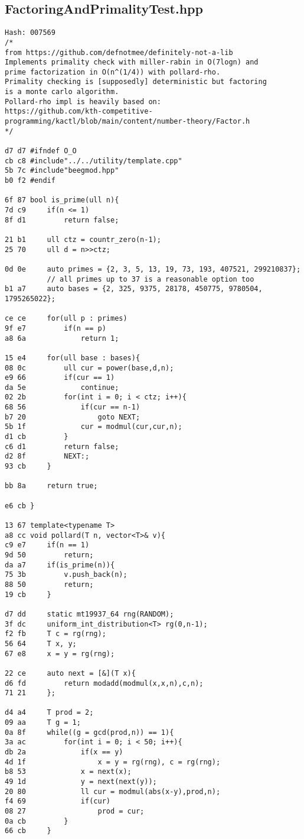 \documentclass[11pt, a4paper, twoside]{article}
\begin{document}
\subsection{FactoringAndPrimalityTest.hpp}
\begin{lstlisting}
Hash: 007569
/*
from https://github.com/defnotmee/definitely-not-a-lib
Implements primality check with miller-rabin in O(7logn) and
prime factorization in O(n^(1/4)) with pollard-rho.
Primality checking is [supposedly] deterministic but factoring
is a monte carlo algorithm.
Pollard-rho impl is heavily based on:
https://github.com/kth-competitive-programming/kactl/blob/main/content/number-theory/Factor.h
*/

d7 d7 #ifndef O_O
cb c8 #include"../../utility/template.cpp"
5b 7c #include"beegmod.hpp"
b0 f2 #endif

6f 87 bool is_prime(ull n){
7d c9     if(n <= 1)
8f d1         return false;
      
21 b1     ull ctz = countr_zero(n-1);
25 70     ull d = n>>ctz;
      
0d 0e     auto primes = {2, 3, 5, 13, 19, 73, 193, 407521, 299210837};
          // all primes up to 37 is a reasonable option too
b1 a7     auto bases = {2, 325, 9375, 28178, 450775, 9780504, 1795265022};
      
ce ce     for(ull p : primes)
9f e7         if(n == p)
a8 6a             return 1;
      
15 e4     for(ull base : bases){
08 0c         ull cur = power(base,d,n);
e9 66         if(cur == 1)
da 5e             continue;
02 2b         for(int i = 0; i < ctz; i++){
68 56             if(cur == n-1)
b7 20                 goto NEXT;
5b 1f             cur = modmul(cur,cur,n);
d1 cb         }
c6 d1         return false;
d2 8f         NEXT:;
93 cb     }
      
bb 8a     return true;
      
e6 cb }

13 67 template<typename T>
a8 cc void pollard(T n, vector<T>& v){
c9 e7     if(n == 1)
9d 50         return;
da a7     if(is_prime(n)){
75 3b         v.push_back(n);
88 50         return;
19 cb     }
      
d7 dd     static mt19937_64 rng(RANDOM);
3f dc     uniform_int_distribution<T> rg(0,n-1);
f2 fb     T c = rg(rng);
56 64     T x, y;
67 e8     x = y = rg(rng);
      
22 ce     auto next = [&](T x){
d6 fd         return modadd(modmul(x,x,n),c,n);
71 21     };
      
d4 a4     T prod = 2;
09 aa     T g = 1;
0a 8f     while((g = gcd(prod,n)) == 1){
3a ac         for(int i = 0; i < 50; i++){
db 2a             if(x == y)
4d 1f                 x = y = rg(rng), c = rg(rng);
b8 53             x = next(x);
49 1d             y = next(next(y));
20 80             ll cur = modmul(abs(x-y),prod,n);
f4 69             if(cur)
08 27                 prod = cur;
0a cb         }
66 cb     }
      

\end{lstlisting}
\end{document}

